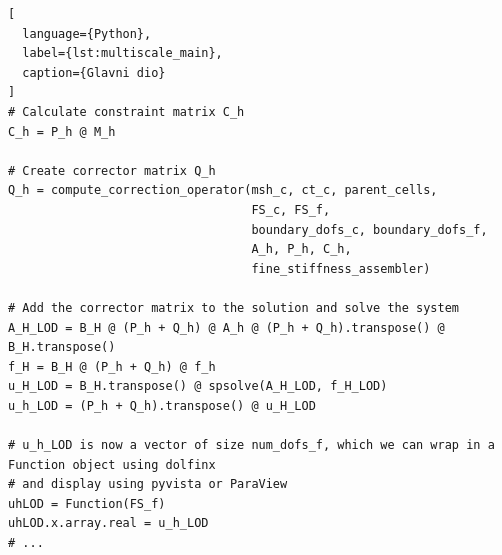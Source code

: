 \documentclass[zavrsnirad]{fer}
\begin{document}
\begin{lstlisting}[
  language={Python},
  label={lst:multiscale_main},
  caption={Glavni dio}
]
# Calculate constraint matrix C_h
C_h = P_h @ M_h

# Create corrector matrix Q_h
Q_h = compute_correction_operator(msh_c, ct_c, parent_cells,
                                  FS_c, FS_f,
                                  boundary_dofs_c, boundary_dofs_f,
                                  A_h, P_h, C_h,
                                  fine_stiffness_assembler)

# Add the corrector matrix to the solution and solve the system
A_H_LOD = B_H @ (P_h + Q_h) @ A_h @ (P_h + Q_h).transpose() @ B_H.transpose()
f_H = B_H @ (P_h + Q_h) @ f_h
u_H_LOD = B_H.transpose() @ spsolve(A_H_LOD, f_H_LOD)
u_h_LOD = (P_h + Q_h).transpose() @ u_H_LOD

# u_h_LOD is now a vector of size num_dofs_f, which we can wrap in a Function object using dolfinx
# and display using pyvista or ParaView
uhLOD = Function(FS_f)
uhLOD.x.array.real = u_h_LOD
# ...
\end{lstlisting}
\end{document}
